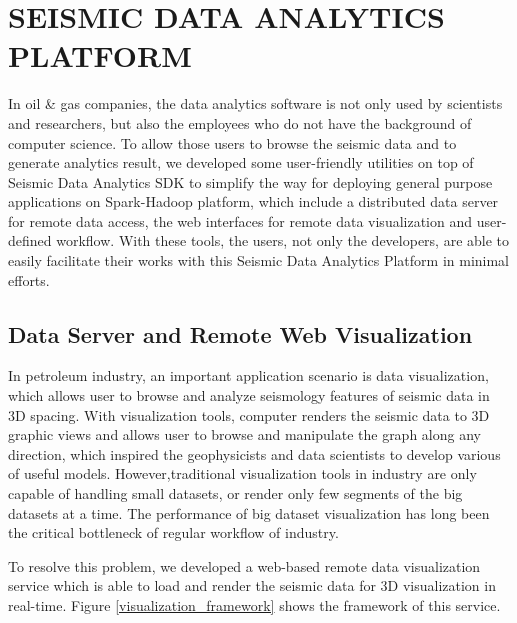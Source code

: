 %
%
%

\chapter{\uppercase{Seismic Data Analytics Platform}}

In oil \& gas companies, the data analytics software is not only used by scientists and researchers, but also the employees who do not have the background of computer science. To allow those users to browse the seismic data and to generate analytics result, we developed some user-friendly utilities on top of Seismic Data Analytics SDK to simplify the way for deploying general purpose applications on Spark-Hadoop platform, which include a distributed data server for remote data access, the web interfaces for remote data visualization and user-defined workflow. With these tools, the users, not only the developers, are able to easily facilitate their works with this Seismic Data Analytics Platform in minimal efforts.


\section{Data Server and Remote Web Visualization}

In petroleum industry, an important application scenario is data visualization, which allows user to browse and analyze seismology features of seismic data in 3D spacing. With visualization tools, computer renders the seismic data to 3D graphic views and allows user to browse and manipulate the graph along any direction, which inspired the geophysicists and data scientists to develop various of useful models. However,traditional visualization tools in industry are only capable of handling small datasets, or render only few segments of the big datasets at a time. The performance of  big dataset visualization has long been the critical bottleneck of regular workflow of industry.

To resolve this problem, we developed a web-based remote data visualization service which is able to load and render the seismic data for 3D visualization in real-time. Figure \ref{visualization_framework} shows the framework of this service. 

